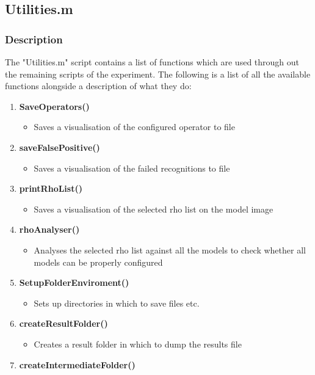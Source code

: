 \subsection{Utilities.m}
\subsubsection{Description}
The "Utilities.m" script contains a list of functions which are used through out the remaining scripts of the experiment. The following is a list of all the available functions alongside a description of what they do:

\begin{enumerate}
    \item {\bf SaveOperators()}
    \begin{itemize}
        \item Saves a visualisation of the configured operator to file
    \end{itemize}
    \item {\bf saveFalsePositive()}
    \begin{itemize}
        \item Saves a visualisation of the failed recognitions to file
    \end{itemize}
    \item {\bf printRhoList()}
    \begin{itemize}
        \item Saves a visualisation of the selected rho list on the model image
    \end{itemize}
    \item {\bf rhoAnalyser()}
    \begin{itemize}
        \item Analyses the selected rho list against all the models to check whether all models can be properly configured
    \end{itemize}
    \item {\bf SetupFolderEnviroment()}
    \begin{itemize}
        \item Sets up directories in which to save files etc.
    \end{itemize}
    \item {\bf createResultFolder()}
    \begin{itemize}
        \item Creates a result folder in which to dump the results file
    \end{itemize}
    \item {\bf createIntermediateFolder()}

\end{enumerate}

